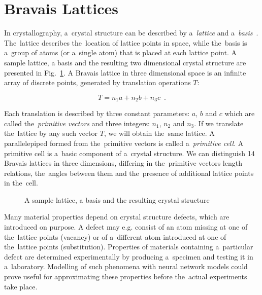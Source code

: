 \documentclass{llncs}
\begin{document}
\section{Bravais Lattices}
In crystallography, a~crystal structure can be described by a~\emph{lattice} and a~\emph{basis}~\cite{kittel1986introduction}. The~lattice describes the~location of lattice points in space, while the~basis is a~group of atoms (or a~single atom) that is placed at each lattice point. A sample lattice, a basis and the resulting two dimensional crystal structure are presented in Fig.~\ref{fig:lattice}. A Bravais lattice in three dimensional space is an infinite array of discrete points, generated by translation operations $T$:

\begin{equation}
T = n_1a + n_2b + n_3c \enspace .
\end{equation}

Each translation is described by three constant parameters: $a$, $b$ and $c$ which are called the~\emph{primitive vectors} and three integers: $n_1$, $n_2$ and $n_3$. If we translate the~lattice by any such vector $T$, we will obtain the~same lattice. A parallelepiped formed from the~primitive vectors is called a~\emph{primitive cell}. A primitive cell is a~basic component of a~crystal structure. We can distinguish 14 Bravais lattices in three dimensions, differing in the~primitive vectors length relations, the~angles between them and the~presence of additional lattice points in the~cell.


\begin{figure}[h!]
\begin{center}
	\caption[]{A sample lattice, a basis and the resulting crystal structure}
	\label{fig:lattice}
\end{center}
\end{figure}


Many material properties depend on crystal structure defects, which are introduced on purpose. A defect may e.g. consist of an atom missing at one of the~lattice points (vacancy) or of a~different atom introduced at one of the~lattice points (substitution). Properties of materials containing a~particular defect are determined experimentally by producing a~specimen and testing it in a~laboratory. Modelling of such phenomena with neural network models could prove useful for approximating these properties before the~actual experiments take place.
\end{document}
